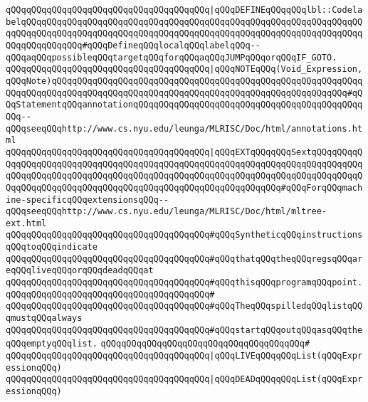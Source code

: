 \verb|qQQqqQQqqQQqqQQqqQQqqQQqqQQqqQQqqQQqqQQq|\verb#|qQQqDEFINEqQQqqQQqlbl::CodelabelqQQqqQQqqQQqqQQqqQQqqQQqqQQqqQQqqQQqqQQqqQQqqQQqqQQqqQQqqQQqqQQqqQQqqQQqqQQqqQQqqQQqqQQqqQQqqQQqqQQqqQQqqQQqqQQqqQQqqQQqqQQqqQQqqQQqqQQqqQQqqQQqqQQqqQQq#\verb|#qQQqDefineqQQqlocalqQQqlabelqQQq--qQQqaqQQqpossibleqQQqtargetqQQqforqQQqaqQQqJUMPqQQqorqQQqIF_GOTO.|\newline
\newline
\verb|qQQqqQQqqQQqqQQqqQQqqQQqqQQqqQQqqQQqqQQq|\verb#|qQQqNOTEqQQq(Void_Expression,qQQqNote)qQQqqQQqqQQqqQQqqQQqqQQqqQQqqQQqqQQqqQQqqQQqqQQqqQQqqQQqqQQqqQQqqQQqqQQqqQQqqQQqqQQqqQQqqQQqqQQqqQQqqQQqqQQqqQQqqQQqqQQqqQQqqQQq#\verb|#qQQqStatementqQQqannotationqQQqqQQqqQQqqQQqqQQqqQQqqQQqqQQqqQQqqQQqqQQqqQQq--qQQqseeqQQqhttp://www.cs.nyu.edu/leunga/MLRISC/Doc/html/annotations.html|\newline
\verb|qQQqqQQqqQQqqQQqqQQqqQQqqQQqqQQqqQQqqQQq|\verb#|qQQqEXTqQQqqQQqSextqQQqqQQqqQQqqQQqqQQqqQQqqQQqqQQqqQQqqQQqqQQqqQQqqQQqqQQqqQQqqQQqqQQqqQQqqQQqqQQqqQQqqQQqqQQqqQQqqQQqqQQqqQQqqQQqqQQqqQQqqQQqqQQqqQQqqQQqqQQqqQQqqQQqqQQqqQQqqQQqqQQqqQQqqQQqqQQqqQQqqQQqqQQqqQQqqQQqqQQqqQQq#\verb|#qQQqForqQQqmachine-specificqQQqextensionsqQQq--qQQqseeqQQqhttp://www.cs.nyu.edu/leunga/MLRISC/Doc/html/mltree-ext.html|\newline
\newline
\verb|qQQqqQQqqQQqqQQqqQQqqQQqqQQqqQQqqQQqqQQq#qQQqSyntheticqQQqinstructionsqQQqtoqQQqindicate|\newline
\verb|qQQqqQQqqQQqqQQqqQQqqQQqqQQqqQQqqQQqqQQq#qQQqthatqQQqtheqQQqregsqQQqareqQQqliveqQQqorqQQqdeadqQQqat|\newline
\verb|qQQqqQQqqQQqqQQqqQQqqQQqqQQqqQQqqQQqqQQq#qQQqthisqQQqprogramqQQqpoint.|\newline
\verb|qQQqqQQqqQQqqQQqqQQqqQQqqQQqqQQqqQQqqQQq#|\newline
\verb|qQQqqQQqqQQqqQQqqQQqqQQqqQQqqQQqqQQqqQQq#qQQqTheqQQqspilledqQQqlistqQQqmustqQQqalways|\newline
\verb|qQQqqQQqqQQqqQQqqQQqqQQqqQQqqQQqqQQqqQQq#qQQqstartqQQqoutqQQqasqQQqtheqQQqemptyqQQqlist.|\newline
\verb|qQQqqQQqqQQqqQQqqQQqqQQqqQQqqQQqqQQqqQQq#|\newline
\verb|qQQqqQQqqQQqqQQqqQQqqQQqqQQqqQQqqQQqqQQq|\verb#|qQQqLIVEqQQqqQQqList(qQQqExpressionqQQq)#\newline
\verb|qQQqqQQqqQQqqQQqqQQqqQQqqQQqqQQqqQQqqQQq|\verb#|qQQqDEADqQQqqQQqList(qQQqExpressionqQQq)#\newline
\newline
